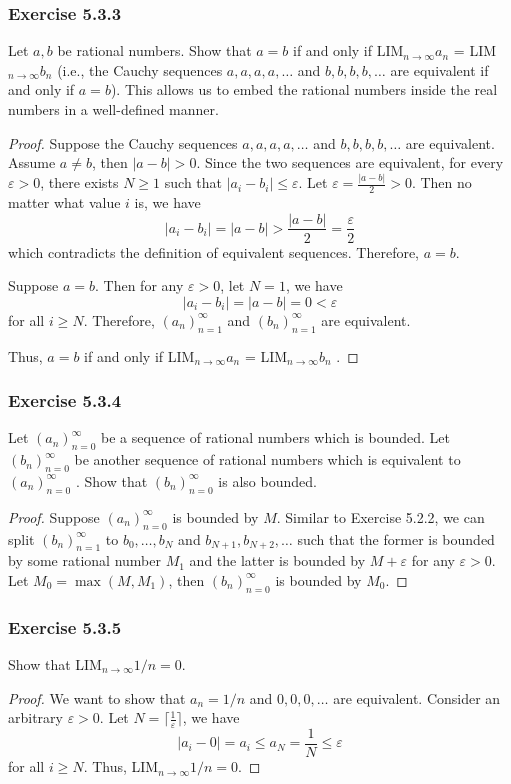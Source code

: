 \documentclass[12pt, letter]{article}
\newcommand{\ssc}{\subsubsection* }
\newcommand{\an}{$(a_n)_{n=1}^\infty$ }
\newcommand{\bn}{$(b_n)_{n=1}^\infty$ }
\newcommand{\anz}{$(a_n)_{n=0}^\infty$ }
\newcommand{\bnz}{$(b_n)_{n=0}^\infty$ }
\newcommand{\la}{LIM$_{n\to\infty}a_n$ }
\newcommand{\lb}{LIM$_{n\to\infty}b_n$ }
\newcommand{\E}{Exercise }
\begin{document}
\ssc{\E 5.3.3}
Let $a,b$ be rational numbers. Show that $a=b$ if and only if \la = \lb (i.e., the Cauchy sequences $a,a,a,a,\dotsc$ and $b,b,b,b,\dotsc$ are equivalent if and only if $a=b$).
This allows us to embed the rational numbers inside the real numbers in a well-defined manner.
\begin{proof}
    Suppose the Cauchy sequences $a,a,a,a,\dotsc$ and $b,b,b,b,\dotsc$ are equivalent. Assume $a\ne b$, then $|a-b|>0$. Since the two sequences are equivalent, for every $\varepsilon>0$,
    there exists $N\geq 1$ such that $|a_i-b_i|\leq \varepsilon$. Let $\varepsilon=\frac{|a-b|}{2}>0$. Then no matter what value $i$ is, we have 
    \begin{equation*}
        |a_i-b_i|=|a-b|>\frac{|a-b|}{2}=\frac{\varepsilon}{2}
    \end{equation*}
    which contradicts the definition of equivalent sequences. Therefore, $a=b$.

    Suppose $a=b$. Then for any $\varepsilon>0$, let $N=1$, we have 
    \begin{equation*}
        |a_i-b_i|=|a-b|=0<\varepsilon
    \end{equation*}
    for all $i\geq N$. Therefore, \an and \bn are equivalent.

    Thus, $a=b$ if and only if \la = \lb.
\end{proof}
\ssc{\E 5.3.4}
Let \anz be a sequence of rational numbers which is bounded. Let \bnz be another sequence of rational numbers which is equivalent to \anz. 
Show that \bnz is also bounded.
\begin{proof}
    Suppose \anz is bounded by $M$. Similar to Exercise 5.2.2, we can split \bn to $b_0,\dotsc,b_N$ and $b_{N+1},b_{N+2},\dotsc$ such that the former is bounded by some rational number $M_1$ and 
    the latter is bounded by $M+\varepsilon$ for any $\varepsilon>0$. Let $M_0=\max(M,M_1)$, then \bnz is bounded by $M_0$. 
\end{proof}
\ssc{\E 5.3.5}
Show that LIM$_{n\to\infty}1/n=0$. 
\begin{proof}
    We want to show that $a_n=1/n$ and $0,0,0,\dotsc$ are equivalent. Consider an arbitrary $\varepsilon>0$. Let $N=\lceil\frac{1}{\varepsilon}\rceil$, we have 
    \begin{equation*}
        |a_i-0|=a_i\leq a_N=\frac{1}{N}\leq \varepsilon
    \end{equation*}
    for all $i\geq N$. 
    Thus, LIM$_{n\to\infty}1/n=0$. 
\end{proof}
\end{document}
